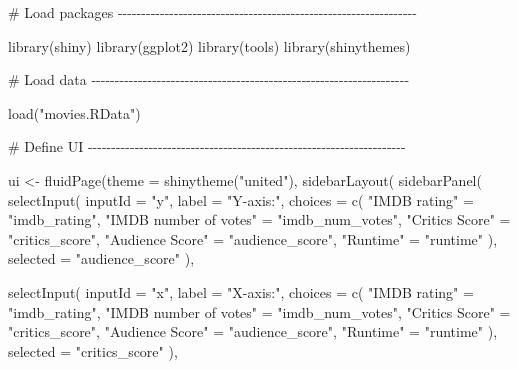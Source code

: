 \documentclass[
  letterpaper,
  DIV=11,
  numbers=noendperiod]{scrreprt}
\newenvironment{Shaded}{\begin{snugshade}}{\end{snugshade}}
\newcommand{\AttributeTok}[1]{\textcolor[rgb]{0.40,0.46,0.14}{#1}}
\newcommand{\CommentTok}[1]{\textcolor[rgb]{0.37,0.37,0.37}{#1}}
\newcommand{\FunctionTok}[1]{\textcolor[rgb]{0.28,0.35,0.67}{#1}}
\newcommand{\NormalTok}[1]{\textcolor[rgb]{0.00,0.46,0.62}{#1}}
\newcommand{\OtherTok}[1]{\textcolor[rgb]{0.00,0.46,0.62}{#1}}
\newcommand{\StringTok}[1]{\textcolor[rgb]{0.13,0.47,0.30}{#1}}
\begin{document}
\begin{Shaded}
\begin{Highlighting}[]
\CommentTok{\# Load packages {-}{-}{-}{-}{-}{-}{-}{-}{-}{-}{-}{-}{-}{-}{-}{-}{-}{-}{-}{-}{-}{-}{-}{-}{-}{-}{-}{-}{-}{-}{-}{-}{-}{-}{-}{-}{-}{-}{-}{-}{-}{-}{-}{-}{-}{-}{-}{-}{-}{-}{-}{-}{-}{-}{-}{-}{-}{-}{-}{-}{-}{-}{-}{-}}

\FunctionTok{library}\NormalTok{(shiny)}
\FunctionTok{library}\NormalTok{(ggplot2)}
\FunctionTok{library}\NormalTok{(tools)}
\FunctionTok{library}\NormalTok{(shinythemes)}

\CommentTok{\# Load data {-}{-}{-}{-}{-}{-}{-}{-}{-}{-}{-}{-}{-}{-}{-}{-}{-}{-}{-}{-}{-}{-}{-}{-}{-}{-}{-}{-}{-}{-}{-}{-}{-}{-}{-}{-}{-}{-}{-}{-}{-}{-}{-}{-}{-}{-}{-}{-}{-}{-}{-}{-}{-}{-}{-}{-}{-}{-}{-}{-}{-}{-}{-}{-}{-}{-}{-}{-}}

\FunctionTok{load}\NormalTok{(}\StringTok{"movies.RData"}\NormalTok{)}

\CommentTok{\# Define UI {-}{-}{-}{-}{-}{-}{-}{-}{-}{-}{-}{-}{-}{-}{-}{-}{-}{-}{-}{-}{-}{-}{-}{-}{-}{-}{-}{-}{-}{-}{-}{-}{-}{-}{-}{-}{-}{-}{-}{-}{-}{-}{-}{-}{-}{-}{-}{-}{-}{-}{-}{-}{-}{-}{-}{-}{-}{-}{-}{-}{-}{-}{-}{-}{-}{-}{-}{-}}

\NormalTok{ui }\OtherTok{\textless{}{-}} \FunctionTok{fluidPage}\NormalTok{(}\AttributeTok{theme =} \FunctionTok{shinytheme}\NormalTok{(}\StringTok{"united"}\NormalTok{),}
  \FunctionTok{sidebarLayout}\NormalTok{(}
    \FunctionTok{sidebarPanel}\NormalTok{(}
      \FunctionTok{selectInput}\NormalTok{(}
        \AttributeTok{inputId =} \StringTok{"y"}\NormalTok{,}
        \AttributeTok{label =} \StringTok{"Y{-}axis:"}\NormalTok{,}
        \AttributeTok{choices =} \FunctionTok{c}\NormalTok{(}
          \StringTok{"IMDB rating"} \OtherTok{=} \StringTok{"imdb\_rating"}\NormalTok{,}
          \StringTok{"IMDB number of votes"} \OtherTok{=} \StringTok{"imdb\_num\_votes"}\NormalTok{,}
          \StringTok{"Critics Score"} \OtherTok{=} \StringTok{"critics\_score"}\NormalTok{,}
          \StringTok{"Audience Score"} \OtherTok{=} \StringTok{"audience\_score"}\NormalTok{,}
          \StringTok{"Runtime"} \OtherTok{=} \StringTok{"runtime"}
\NormalTok{        ),}
        \AttributeTok{selected =} \StringTok{"audience\_score"}
\NormalTok{      ),}

      \FunctionTok{selectInput}\NormalTok{(}
        \AttributeTok{inputId =} \StringTok{"x"}\NormalTok{,}
        \AttributeTok{label =} \StringTok{"X{-}axis:"}\NormalTok{,}
        \AttributeTok{choices =} \FunctionTok{c}\NormalTok{(}
          \StringTok{"IMDB rating"} \OtherTok{=} \StringTok{"imdb\_rating"}\NormalTok{,}
          \StringTok{"IMDB number of votes"} \OtherTok{=} \StringTok{"imdb\_num\_votes"}\NormalTok{,}
          \StringTok{"Critics Score"} \OtherTok{=} \StringTok{"critics\_score"}\NormalTok{,}
          \StringTok{"Audience Score"} \OtherTok{=} \StringTok{"audience\_score"}\NormalTok{,}
          \StringTok{"Runtime"} \OtherTok{=} \StringTok{"runtime"}
\NormalTok{        ),}
        \AttributeTok{selected =} \StringTok{"critics\_score"}
\NormalTok{      ),}


\end{Highlighting}
\end{Shaded}
\end{document}
